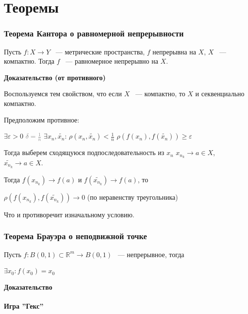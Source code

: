 \documentclass{article}
\begin{document}
\newpage
	
\part{Теоремы}

	\newpage
	
	\section{Теорема Кантора о равномерной непрерывности}
	
		Пусть $f: X \rightarrow Y$ ~--- метрические пространства, $f$ непрерывна на $X$, $X$ ~--- компактно. Тогда $f$ ~--- равномерное непрерывно на $X$.
		
		\textbf{Доказательство (от противного)}
		
			Воспользуемся тем свойством, что если $X$ ~--- компактно, то $X$ и секвенциально компактно.
			
			Предположим противное:
			
			$\exists \varepsilon > 0$ \textcolor{gray}{$\delta = \frac{1}{n}$} $\exists x_n,  \widetilde{x_n}$: $\rho(x_n, \widetilde{x_n}) < \frac{1}{n}$ $\rho(f(x_n), f(\widetilde{x_n})) \geq \varepsilon$
			
			Тогда выберем сходящуюся подпоследовательность из $x_n$ $x_{n_k} \rightarrow a \in X$, $\widetilde{x_{n_k}} \rightarrow a \in X$.
			
			Тогда $f(x_{n_k}) \rightarrow f(a)$ и $f(\widetilde{x_{n_k}}) \rightarrow f(a)$, то
			
			$\rho(f(x_{n_k}), f(\widetilde{x_{n_k}})) \rightarrow 0$ (по неравенству треугольника)
			
			Что и противоречит изначальному условию.

	\newpage
	
	\section{Теорема Брауэра о неподвижной точке}
	
		Пусть $f: B(0, 1) \subset \mathbb{R}^m \rightarrow B(0, 1)$ ~--- непрерывное, тогда
		
		$\exists x_0 : f(x_0) = x_0$
		
		\textbf{Доказательство}
		
		\subsection{Игра ''Гекс''}
		
\end{document}
